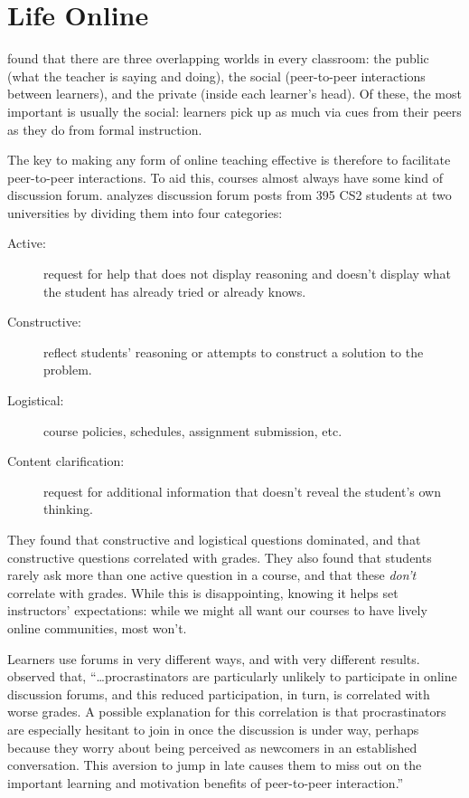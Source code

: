 \section{Life Online}\label{s:online-engagement}

\cite{Nuth2007} found that there are three overlapping worlds in
every classroom: the public (what the teacher is saying and doing), the
social (peer-to-peer interactions between learners), and the private
(inside each learner's head). Of these, the most important is usually
the social: learners pick up as much via cues from their peers as they
do from formal instruction.

The key to making any form of online teaching effective is therefore to
facilitate peer-to-peer interactions. To aid this, courses almost always
have some kind of discussion forum. \cite{Vell2017} analyzes
discussion forum posts from 395 CS2 students at two universities by
dividing them into four categories:

\begin{description}
\item[Active:]
request for help that does not display reasoning and doesn't display
what the student has already tried or already knows.
\item[Constructive:]
reflect students' reasoning or attempts to construct a solution to
the problem.
\item[Logistical:]
course policies, schedules, assignment submission, etc.
\item[Content clarification:]
request for additional information that doesn't reveal the student's
own thinking.
\end{description}

They found that constructive and logistical questions dominated, and
that constructive questions correlated with grades. They also found that
students rarely ask more than one active question in a course, and that
these \emph{don't} correlate with grades. While this is disappointing,
knowing it helps set instructors' expectations: while we might all want
our courses to have lively online communities, most won't.

Learners use forums in very different ways, and with very different
results. \cite{Mill2016a} observed that, ``{\ldots}procrastinators are
particularly unlikely to participate in online discussion forums, and
this reduced participation, in turn, is correlated with worse
grades. A possible explanation for this correlation is that
procrastinators are especially hesitant to join in once the discussion
is under way, perhaps because they worry about being perceived as
newcomers in an established conversation. This aversion to jump in
late causes them to miss out on the important learning and motivation
benefits of peer-to-peer interaction.''

